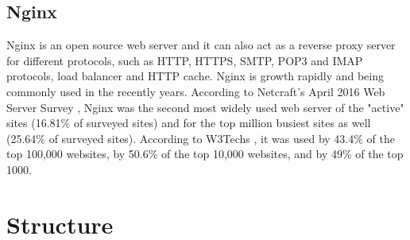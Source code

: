 \subsection{Nginx}
Nginx \cite{4_the_documentation_nginx} is an open source web server and it can also act as a reverse proxy server for different protocols, such as HTTP, HTTPS, SMTP, POP3 and IMAP protocols, load balancer and HTTP cache. Nginx is growth rapidly and being commonly used in the recently years. According to Netcraft's April 2016 Web Server Survey \cite{6_web_server_survey}, Nginx was the second most widely used web server of the "active" sites (16.81\% of surveyed sites) and for the top million busiest sites as well (25.64\% of surveyed sites). According to W3Techs \cite{7_w3techs}, it was used by 43.4\% of the top 100,000 websites, by 50.6\% of the top 10,000 websites, and by 49\% of the top 1000. 

\section{Structure}